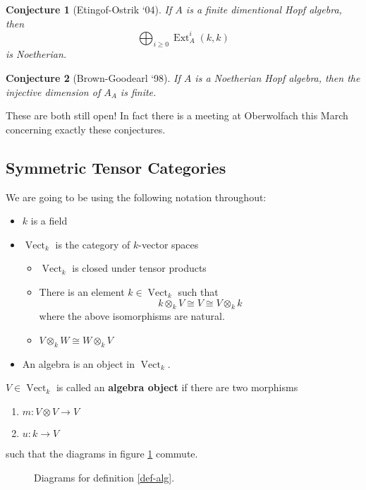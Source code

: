 \documentclass[12pt]{article}
\theoremstyle{nonumberbreak}
\theoremstyle{changebreak}
\theoremstyle{break}
\theoremstyle{nonumberbreak}
\theoremstyle{nonumberplain}
\newtheorem{conj}{Conjecture}
\theoremstyle{change}
\DeclareMathOperator{\Ext}{Ext}
\DeclareMathOperator{\id}{id}
\newcommand*{\Vectk}{\operatorname{Vect}_k}
\begin{document}
\begin{conj}[Etingof-Ostrik `04]
	If $A$ is a finite dimentional Hopf algebra, then 
	\[\bigoplus_{i\ge 0}\Ext_A^i(k,k)\]
	is Noetherian.
\end{conj}

\begin{conj}[Brown-Goodearl `98]
	If $A$ is a Noetherian Hopf algebra, then the injective dimension of $A_A$ is finite.
\end{conj}

These are both still open! In fact there is a meeting at Oberwolfach this March concerning
exactly these conjectures.

\subsection{Symmetric Tensor Categories}
We are going to be using the following notation throughout:
\begin{itemize}
	\item $k$ is a field
	\item $\Vectk$ is the category of $k$-vector spaces
	\begin{itemize}
		\item $\Vectk$ is closed under tensor products
		\item There is an element $k\in\Vectk$ such that
		\[k\otimes_k V\cong V\cong V\otimes_k k\]
		where the above isomorphisms are natural.
		\item $V\otimes_k W\cong W\otimes_k V$
	\end{itemize}
	\item An algebra is an object in $\Vectk$.
\end{itemize}

\begin{defn}\label{def-alg}
	$V\in\Vectk$ is called an \textbf{algebra object} if there are two morphisms
	\begin{enumerate}
		\item $m:V\otimes V\to V$
		\item $u:k\to V$
	\end{enumerate}
	such that the diagrams in figure \ref{fig-alg} commute.
	
\end{defn}
\begin{figure}\label{fig-alg}
	\caption{Diagrams for definition \ref{def-alg}.}
\end{figure}
\end{document}
